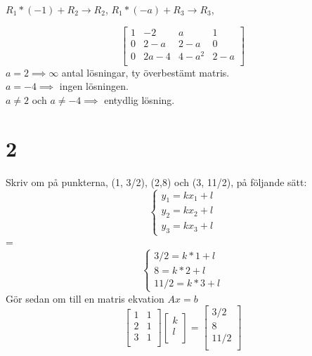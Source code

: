 \documentclass{article}
\begin{document}
$R_1 * (-1) + R_2 \rightarrow R_2$, \quad
$R_1 * (-a) + R_3 \rightarrow R_3$, \quad

$$
\begin{bmatrix}
    1  & -2     &  a       &  1 \\
    0  & 2-a    &  2-a     &  0  \\
    0  & 2a-4   &  4-a^2   &  2-a   \\
\end{bmatrix}
$$
$a = 2 \implies \infty$ antal lösningar, ty överbestämt matris. \\
$a = -4 \implies $ ingen lösningen. \\
$a \neq 2 $ och $a \neq -4 \implies $ entydlig lösning.


\section*{2}
Skriv om på punkterna, (1, 3/2), (2,8) och (3, 11/2), på följande sätt: \\
\begin{equation}
    \begin{cases}
                   y_1 = kx_1 + l\\
                   y_2 = kx_2 + l \\
                   y_3 = kx_3 + l
    \end{cases}
\end{equation} 
=
\begin{equation}
    \begin{cases}
                   3/2  = k*1 + l\\
                   8    = k*2 + l \\
                   11/2 = k*3 + l
    \end{cases}
\end{equation} 
Gör sedan om till en matris ekvation $Ax = b$ \\
$$
\begin{bmatrix}
    1  &  1 \\
    2  &  1 \\
    3  &  1 \\
\end{bmatrix}
\begin{bmatrix}
    k \\
    l \\
\end{bmatrix}
=
\begin{bmatrix}
    3/2 \\
    8   \\
    11/2  \\
\end{bmatrix}
$$
\end{document}
